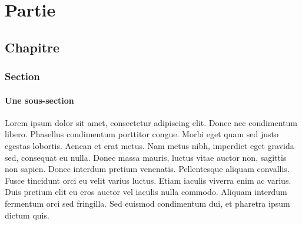 \documentclass{report}
\begin{document}
\part{Partie}
\chapter{Chapitre}
\section{Section}
\subsection{Une sous-section}
Lorem ipsum dolor sit amet, consectetur adipiscing elit.
Donec nec condimentum libero. Phasellus condimentum porttitor
congue.
Morbi eget quam sed justo egestas lobortis. Aenean et erat metus.
Nam metus nibh, imperdiet eget gravida sed, consequat eu nulla.
Donec massa mauris, luctus vitae auctor non, sagittis non sapien.
Donec interdum pretium venenatis. Pellentesque aliquam convallis.
Fusce tincidunt orci eu velit varius luctus. Etiam iaculis viverra
enim ac varius.
Duis pretium elit eu eros auctor vel iaculis nulla commodo. Aliquam
interdum fermentum orci sed fringilla.
Sed euismod condimentum dui, et pharetra ipsum dictum quis.
\end{document}
